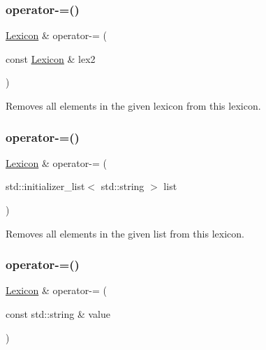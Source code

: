 \subsubsection{\texorpdfstring{operator-\/=()}{operator-=()}\hspace{0.1cm}{\footnotesize\ttfamily [1/3]}}
{\footnotesize\ttfamily \mbox{\hyperlink{classLexicon}{Lexicon}} \& operator-\/= (\begin{DoxyParamCaption}\item[{const \mbox{\hyperlink{classLexicon}{Lexicon}} \&}]{lex2 }\end{DoxyParamCaption})}



Removes all elements in the given lexicon from this lexicon. 

\mbox{\label{classLexicon_a1b3ac9124341c069a604d760190789b1}} 
\subsubsection{\texorpdfstring{operator-\/=()}{operator-=()}\hspace{0.1cm}{\footnotesize\ttfamily [2/3]}}
{\footnotesize\ttfamily \mbox{\hyperlink{classLexicon}{Lexicon}} \& operator-\/= (\begin{DoxyParamCaption}\item[{std\+::initializer\+\_\+list$<$ std\+::string $>$}]{list }\end{DoxyParamCaption})}



Removes all elements in the given list from this lexicon. 

\mbox{\label{classLexicon_a4acb1cafdecdbf77b1d62f2372a6d244}} 
\subsubsection{\texorpdfstring{operator-\/=()}{operator-=()}\hspace{0.1cm}{\footnotesize\ttfamily [3/3]}}
{\footnotesize\ttfamily \mbox{\hyperlink{classLexicon}{Lexicon}} \& operator-\/= (\begin{DoxyParamCaption}\item[{const std\+::string \&}]{value }\end{DoxyParamCaption})}



